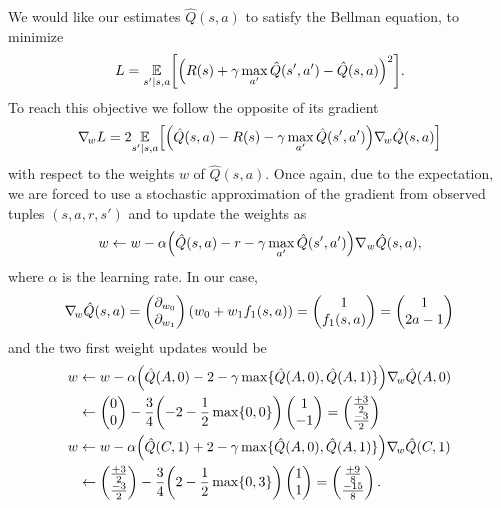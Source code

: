 \documentclass[11pt, a4paper]{article}
\begin{document}
\begin{enumerate}
    \begin{solution}
        We would like our estimates $\hat{Q}(s, a)$ to satisfy the
        Bellman equation, \ie{} to minimize
        \begin{equation*}
            L = \underset{s' \knowing s, a}{\E} \sbk*{\rbk*{R(s) + \gamma \max_{a'} \hat{Q}(s', a') - \hat{Q}(s, a)}^2} .
        \end{equation*}
        To reach this objective we follow the opposite of its gradient
        \begin{equation*}
            \nabla_{\!w} L = 2 \underset{s' \knowing s, a}{\E} \sbk*{\rbk*{\hat{Q}(s, a) - R(s) - \gamma \max_{a'} \hat{Q}(s', a')} \nabla_{\!w} \hat{Q}(s, a)}
        \end{equation*}
        with respect to the weights\footnotemark{} $w$ of $\hat{Q}(s, a)$. Once again, due to the expectation, we are forced to use a stochastic approximation of the gradient from observed tuples $(s, a, r, s')$ and to update the weights as
        \begin{equation*}
            w \gets w - \alpha \rbk*{\hat{Q}(s, a) - r - \gamma \max_{a'} \hat{Q}(s', a')} \nabla_w \hat{Q}(s, a) ,
        \end{equation*}
        where $\alpha$ is the learning rate. In our case,
        \begin{equation*}
            \nabla_{\!w} \hat{Q}(s, a) = \begin{pmatrix}\partial_{w_0} \\ \partial_{w_1} \end{pmatrix} (w_0 + w_1 f_1(s, a)) = \begin{pmatrix} 1 \\ f_1(s, a)\end{pmatrix} = \begin{pmatrix}1 \\ 2 a - 1\end{pmatrix}
        \end{equation*}
        and the two first weight updates would be
        \begin{align*}
            w & \gets w - \alpha \rbk*{\hat{Q}(A, 0) - 2 - \gamma \max \cbk{\hat{Q}(A, 0), \hat{Q}(A, 1)}} \nabla_{\!w} \hat{Q}(A, 0) \\
            & \gets \mat{0 \\ 0} - \frac{3}{4} \rbk*{-2 - \frac{1}{2} \max\cbk{0, 0}} \mat{1 \\ -1} = \mat{\frac{+3}{2} \\ \frac{-3}{2}} \\
            w & \gets w - \alpha \rbk*{\hat{Q}(C, 1) + 2 - \gamma \max \cbk{\hat{Q}(A, 0), \hat{Q}(A, 1)}} \nabla_{\!w} \hat{Q}(C, 1) \\
            & \gets \mat{\frac{+3}{2} \\ \frac{-3}{2}} - \frac{3}{4} \rbk*{2 - \frac{1}{2} \max\cbk{0, 3}} \mat{1 \\ 1} = \mat{\frac{+9}{8} \\ \frac{-15}{8}} .
        \end{align*}


\end{solution}
\end{enumerate}
\end{document}
